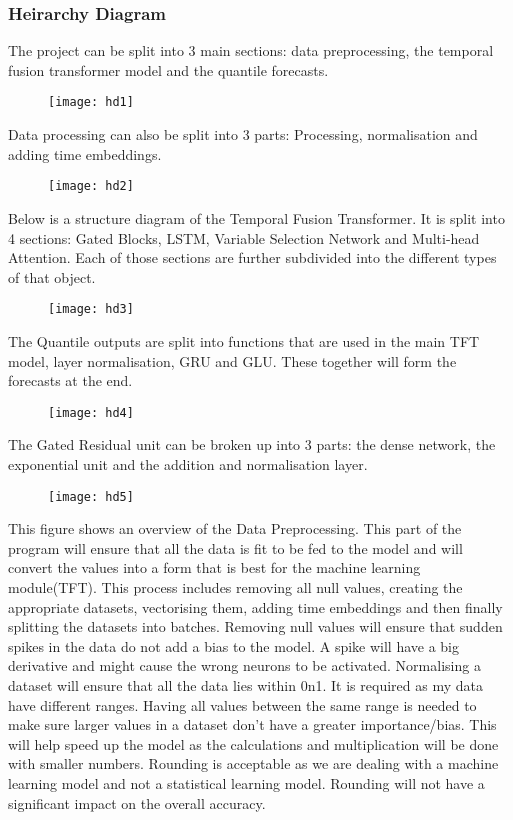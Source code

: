 \documentclass{article}
\begin{document}
\subsubsection{Heirarchy Diagram}
The project can be split into 3 main sections: data preprocessing, the temporal fusion transformer model and the quantile forecasts.
\begin{figure}[ht]
    \centering
    \texttt{[image: hd1]}
    \caption{}
\end{figure}
Data processing can also be split into 3 parts: Processing, normalisation and adding time embeddings.
\begin{figure}[ht]
    \centering
    \texttt{[image: hd2]}
    \caption{}
\end{figure}
Below is a structure diagram of the Temporal Fusion Transformer. It is split into 4 sections: Gated Blocks, LSTM, Variable Selection Network and Multi-head Attention. Each of those sections are further subdivided into the different types of that object.
\begin{figure}[ht]
    \centering
    \texttt{[image: hd3]}
    \caption{}
\end{figure}
The Quantile outputs are split into functions that are used in the main TFT model, layer normalisation, GRU and GLU. These together will form the forecasts at the end.
\begin{figure}[ht]
    \centering
    \texttt{[image: hd4]}
    \caption{}
\end{figure}
The Gated Residual unit can be broken up into 3 parts: the dense network, the exponential unit and the addition and normalisation layer.
\begin{figure}[ht]
    \centering
    \texttt{[image: hd5]}
    \caption{}
\end{figure}
This figure shows an overview of the Data Preprocessing. This part of the program will ensure that all the data is fit to be fed to the model and will convert the values into a form that is best for the machine learning module(TFT). This process includes removing all null values, creating the appropriate datasets, vectorising them, adding time embeddings and then finally splitting the datasets into batches.
Removing null values will ensure that sudden spikes in the data do not add a bias to the model. A spike will have a big derivative and might cause the wrong neurons to be activated.
Normalising a dataset will ensure that all the data lies within 0n1. It is required as my data have different ranges. Having all values between the same range is needed to make sure larger values in a dataset don't have a greater importance/bias. This will help speed up the model as the calculations and multiplication will be done with smaller numbers. Rounding is acceptable as we are dealing with a machine learning model and not a statistical learning model. Rounding will not have a significant impact on the overall accuracy.
\end{document}
